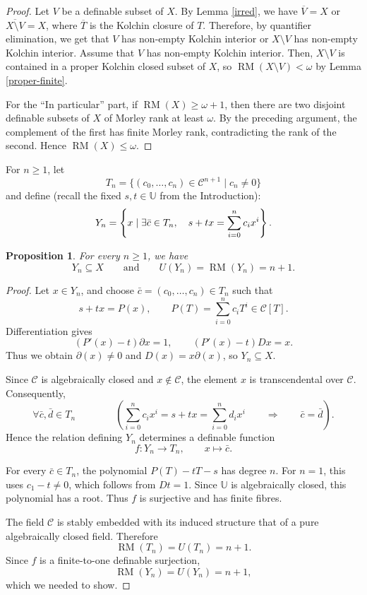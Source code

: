 \documentclass[11pt,a4paper]{amsart}
\newtheorem{proposition}[theorem]{Proposition}
\theoremstyle{definition}
\newcommand{\RM}{\operatorname{RM}}
\newcommand{\Ucal}{{\mathds{U}}}
\newcommand{\C}{\mathcal C}
\newcommand{\Uu}{{\mathds{U}}}
\begin{document}
\begin{proof}
Let $V$ be a definable subset of $X$. By Lemma \ref{irred}, we have $\overline{V}=X$ or $\overline{X\setminus V}=X$, where $\overline{T}$ is the Kolchin closure of $T$. Therefore, by quantifier elimination, we get that $V$ has non-empty Kolchin interior or $X\setminus V$ has non-empty Kolchin interior. Assume that $V$ has non-empty Kolchin interior. Then, $X\setminus V$ is contained in a proper Kolchin closed subset of $X$, so $\RM(X\setminus V)<\omega$ by Lemma \ref{proper-finite}.

For the ``In particular'' part, if $\RM(X)\geqslant\omega+1$, then there are two disjoint
definable subsets of $X$ of Morley rank at least $\omega$.
By the preceding argument, the complement of the first
has finite Morley rank, contradicting the rank of the
second. Hence $\RM(X)\leqslant\omega$.
\end{proof}
For $n\geqslant1$, let
\[
 T_n=\{(c_0,\ldots,c_n)\in\C^{n+1}\mid c_n\neq0\}
\]
and define (recall the fixed $s,t\in \Uu$ from the Introduction):
\begin{equation}\label{Yn}
 Y_n=\left\{x\mid \exists\bar c\in T_n,\quad
          s+tx=\sum_{i=0}^{n}c_i x^i\right\}.
          \notag
\end{equation}
\begin{proposition}\label{exceptional-rank}
For every $n\geqslant1$, we have
\[
Y_n\subseteq X\qquad \text{and}\qquad U(Y_n)=\RM(Y_n)=n+1.
\]
\end{proposition}
\begin{proof}
Let $x\in Y_n$, and choose $\bar c=(c_0,\ldots,c_n)\in T_n$ such that
\[
s+tx=P(x),
\qquad
P(T)=\sum_{i=0}^n c_iT^i\in \C[T].
\]
Differentiation gives
\[
(P'(x)-t)\partial x=1,
\qquad
(P'(x)-t)Dx=x.
\]
Thus we obtain $\partial (x)\neq0$ and $D(x)=x\partial (x)$, so $Y_n\subseteq X$.

Since $\C$ is algebraically closed and $x\notin\C$,
the element $x$ is transcendental over $\C$.
Consequently,
\[
\forall \bar c,\bar d\in T_n\qquad \qquad \left(
\sum_{i=0}^n c_i x^i
=s+tx
=\sum_{i=0}^n d_i x^i
\qquad \Longrightarrow\qquad \bar c=\bar d\right).
\]
Hence the relation defining
$Y_n$ determines a definable function
\[
f:Y_n\longrightarrow T_n,\qquad x\longmapsto\bar c.
\]

For every $\bar c\in T_n$, the polynomial
$P(T)-tT-s$ has degree $n$. For $n=1$, this uses
$c_1-t\neq0$, which follows from $Dt=1$.
Since $\Ucal$ is algebraically closed, this polynomial
has a root. Thus $f$ is surjective and has finite fibres.

The field $\C$ is stably embedded with its induced
structure that of a pure algebraically closed field.
Therefore
\[
\RM(T_n)=U(T_n)=n+1.
\]
Since $f$ is a finite-to-one definable surjection,
\[
\RM(Y_n)=U(Y_n)=n+1,
\]
which we needed to show.
\end{proof}
\end{document}
